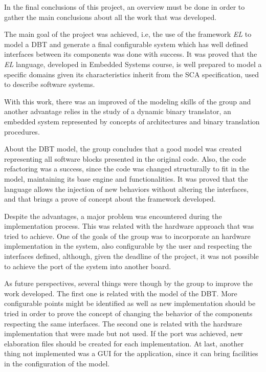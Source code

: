 
In the final conclusions of this project, an overview must be done in order to gather the main conclusions about all the work that was developed. 

The main goal of the project was achieved, i.e, the use of the framework \textit{EL} to model a DBT and generate a final configurable system which has well defined interfaces between its components was done with success. It was proved that the \textit{EL} language, developed in Embedded Systems course, is well prepared to model a specific domains given its characteristics inherit from the SCA specification, used to describe software systems.

With this work, there was an improved of the modeling skills of the group and another advantage relies in the study of a dynamic binary translator, an embedded system represented by concepts of architectures and binary translation procedures. 

About the DBT model, the group concludes that a good model was created representing all software blocks presented in the original code. Also, the code refactoring was a success, since the code was changed structurally to fit in the model, maintaining its base engine and functionalities. It was proved that the language allows the injection of new behaviors without altering the interfaces, and that brings a prove of concept about the framework developed.  

Despite the advantages, a major problem was encountered during the implementation process. This was related with the hardware approach that was tried to achieve. One of the goals of the group was to incorporate an hardware implementation in the system, also configurable by the user and respecting the interfaces defined, although, given the deadline of the project, it was not possible to achieve the port of the system into another board.

As future perspectives, several things were though by the group to improve the work developed. The first one is related with the model of the DBT. More configurable points might be identified as well as new implementation should be tried in order to prove the concept of changing the behavior of the components respecting the same interfaces. The second one is related with the hardware implementation that were made but not used. If the port was achieved, new elaboration files should be created for each implementation. At last, another thing not implemented was a GUI for the application, since it can bring facilities in the configuration of the model. 